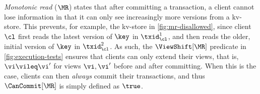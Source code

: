 \emph{Monotonic read} (\( \MR \)) \citep{session-guarantee,repldatatypes} states that after committing a transaction, 
a client cannot lose information in that 
it can only see increasingly more versions from a kv-store.
This prevents, for example, the kv-store in \cref{fig:mr-disallowed},
since client \(\cl\) first reads the latest version of \(\key\) in \(\txid_{\cl}^{1}\), 
and then reads the older, initial version of \(\key\) in \(\txid_{\cl}^{2}\).  
As such, the \(\ViewShift[\MR]\) predicate in \cref{fig:execution-tests} 
ensures that clients can only extend their views,
that is, \( \vi \vileq \vi' \) for views \( \vi, \vi'\) before and after committing.
When this is the case, clients can then \emph{always} commit their transactions,
and thus \(\CanCommit[\MR]\) is simply defined as \(\true\). 
